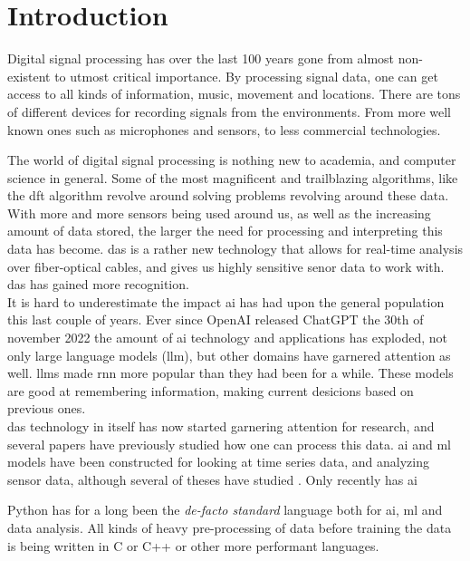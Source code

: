 \chapter{Introduction}
\label{chap:introduction}

Digital signal processing has over the last 100 years gone from almost non-existent to utmost critical importance. By processing signal data, one can get access to all kinds of information, music, movement and locations. There are tons of different devices for recording signals from the environments. From more well known ones such as microphones and sensors, to less commercial technologies.

The world of digital signal processing is nothing new to academia, and computer science in general. Some of the most magnificent and trailblazing algorithms, like the \acrfull{dft} algorithm revolve around solving problems revolving around these data. With more and more sensors being used around us, as well as the increasing amount of data stored, the larger the need for processing and interpreting this data has become. 
\acrfull{das} is a rather new technology that allows for real-time analysis over fiber-optical cables, and gives us highly sensitive senor data to work with. \acrshort{das} has gained more recognition. \\

It is hard to underestimate the impact \acrshort{ai} has had upon the general population this last couple of years. Ever since OpenAI released ChatGPT the 30th of november 2022 \cite{chatgpt} the amount of \acrshort{ai} technology and applications has exploded, not only large language models (\acrshort{llm}), but other domains have garnered attention as well. \acrshort{llm}s made \acrfull{rnn} more popular than they had been for a while. These models are good at remembering information, making current desicions based on previous ones. \\ 

\acrshort{das} technology in itself has now started garnering attention for research, and several papers have previously studied  how one can process this data. \acrshort{ai} and \acrshort{ml} models have been constructed for looking at time series data, and analyzing sensor data, although several of theses have studied .  Only recently has \acrshort{ai}




Python has for a long been the \textit{de-facto standard} language both for \acrshort{ai}, \acrshort{ml} and data analysis. All kinds of heavy pre-processing of data before training the data is being written in C or C++ or other more performant languages.    


